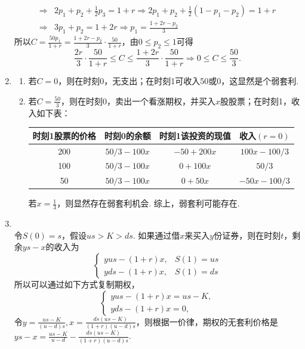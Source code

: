 \begin{enumerate}[label=\arabic{section}.\arabic*]
\begin{align*}
        \Rightarrow & 2p_1+p_2+\frac{1}{2}p_3=1+r \Rightarrow 2p_1+p_2+\frac{1}{2}(1-p_1-p_2)=1+r\\
        \Rightarrow & 3p_1+p_2=1+2r \Rightarrow p_1=\frac{1+2r-p_2}{3}
    \end{align*}
    所以$\displaystyle C=\frac{50p_1}{1+r}=\frac{1+2r-p_2}{3}\cdot\frac{50}{1+r}$，由$0 \leq p_2 \leq 1$可得
    \[\frac{2r}{3}\cdot\frac{50}{1+r} \leq C \leq \frac{1+2r}{3}\cdot\frac{50}{1+r} \Rightarrow 0 \leq C \leq \frac{50}{3}.\]
    \item \sol
    \begin{enumerate}[label=\alph*)]
        \item 若$C=0$，则在时刻0，无支出；在时刻1可收入50或0，这显然是个弱套利.
        \item 若$\displaystyle C=\frac{50}{3}$，则在时刻0，卖出一个看涨期权，并买入$x$股股票；在时刻1，收入如下表：
        \begin{table}[H]
            \centering
            \begin{tabular}{|c|c|c|c|}
                \hline
                时刻1股票的价格 & 时刻0的余额 & 时刻1该投资的现值 & 收入$(r=0)$ \\ \hline
                200 & $50/3-100x$ & $-50+200x$ & $100x-100/3$ \\ \hline
                100 & $50/3-100x$ & $0+100x$ & $50/3$ \\ \hline
                50 & $50/3-100x$ & $0+50x$ & $-50x-100/3$ \\ \hline
            \end{tabular}
        \end{table}
        若$\displaystyle x=\frac{1}{3}$，则显然存在弱套利机会. 综上，弱套利可能存在.
    \end{enumerate}
    \item \sol\\
    令$S(0)=s$，假设$us>K>ds$. 如果通过借$x$来买入$y$份证券，则在时刻$t$，剩余$ys-x$的收入为
    \[\begin{cases}
        yus-(1+r)x, & S(1)=us\\yds-(1+r)x, & S(1)=ds
    \end{cases}\]
    所以可以通过如下方式复制期权，
    \[\begin{cases}
        yus-(1+r)x=us-K,\\yds-(1+r)x=0,
    \end{cases}\]
    令$\displaystyle y=\frac{us-K}{(u-d)s},x=\frac{ds(us-K)}{(1+r)(u-d)s}$，则根据一价律，期权的无套利价格是$\displaystyle ys-x=\frac{us-K}{u-d}-\frac{ds(us-K)}{(1+r)(u-d)s}$.

\end{enumerate}
